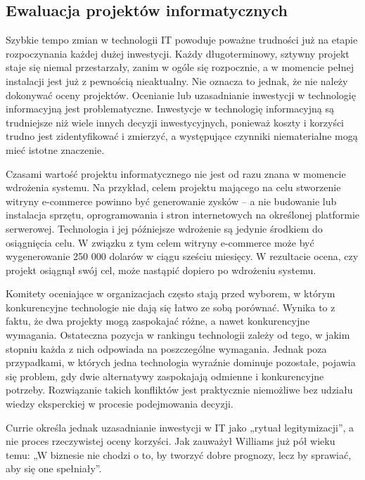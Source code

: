 \subsection{Ewaluacja projektów informatycznych}
Szybkie tempo zmian w technologii IT powoduje poważne trudności już na etapie rozpoczynania każdej dużej inwestycji. Każdy długoterminowy, sztywny projekt staje się niemal przestarzały, zanim w ogóle się rozpocznie, a w momencie pełnej instalacji jest już z pewnością nieaktualny. Nie oznacza to jednak, że nie należy dokonywać oceny projektów. Ocenianie lub uzasadnianie inwestycji w technologię informacyjną jest problematyczne. Inwestycje w technologię informacyjną są trudniejsze niż wiele innych decyzji inwestycyjnych, ponieważ koszty i korzyści trudno jest zidentyfikować i zmierzyć, a występujące czynniki niematerialne mogą mieć istotne znaczenie. \autocite{powell1992information}

Czasami wartość projektu informatycznego nie jest od razu znana w momencie wdrożenia systemu. Na przykład, celem projektu mającego na celu stworzenie witryny e-commerce powinno być generowanie zysków – a nie budowanie lub instalacja sprzętu, oprogramowania i stron internetowych na określonej platformie serwerowej. Technologia i jej późniejsze wdrożenie są jedynie środkiem do osiągnięcia celu. W związku z tym celem witryny e-commerce może być wygenerowanie 250 000 dolarów w ciągu sześciu miesięcy. W rezultacie ocena, czy projekt osiągnął swój cel, może nastąpić dopiero po wdrożeniu systemu.\autocite{ITPMMarchewka}

Komitety oceniające w organizacjach często stają przed wyborem, w którym konkurencyjne technologie nie dają się łatwo ze sobą porównać. Wynika to z faktu, że dwa projekty mogą zaspokajać różne, a nawet konkurencyjne wymagania. Ostateczna pozycja w rankingu technologii zależy od tego, w jakim stopniu każda z nich odpowiada na poszczególne wymagania. Jednak poza przypadkami, w których jedna technologia wyraźnie dominuje pozostałe, pojawia się problem, gdy dwie alternatywy zaspokajają odmienne i konkurencyjne potrzeby. Rozwiązanie takich konfliktów jest praktycznie niemożliwe bez udziału wiedzy eksperckiej w procesie podejmowania decyzji.\autocite{thomaidis2006evaluation}

Currie określa jednak uzasadnianie inwestycji w IT jako „rytuał legitymizacji”, a nie proces rzeczywistej oceny korzyści.\autocite{Currie1989} Jak zauważył Williams już pół wieku temu: „W biznesie nie chodzi o to, by tworzyć dobre prognozy, lecz by sprawiać, aby się one spełniały”.\autocite{williams1967technology}

